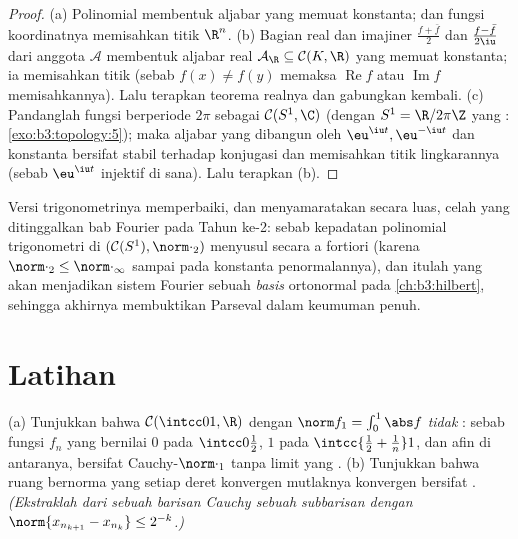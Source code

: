 \begin{proof}
(a) Polinomial membentuk aljabar yang memuat konstanta; dan fungsi
koordinatnya memisahkan titik $\R^n$.
(b) Bagian real dan imajiner $\frac{f + \bar f}2$ dan
$\frac{f - \bar f}{2\iu}$ dari anggota $\mathcal A$ membentuk
aljabar real $\mathcal A_\R \subseteq \mathcal C(K, \R)$ yang memuat
konstanta; ia memisahkan titik (sebab $f(x) \ne f(y)$ memaksa
$\operatorname{Re}f$ atau $\operatorname{Im}f$ memisahkannya).
Lalu terapkan teorema realnya dan gabungkan kembali.
(c) Pandanglah fungsi berperiode $2\pi$ sebagai $\mathcal C(S^1, \C)$
(dengan $S^1 = \R/2\pi\Z$ yang :
\cref{exo:b3:topology:5}); maka aljabar yang dibangun oleh
$\eu^{\iu t}, \eu^{-\iu t}$ dan konstanta bersifat stabil terhadap
konjugasi dan memisahkan titik lingkarannya (sebab $\eu^{\iu t}$
injektif di sana). Lalu terapkan (b).
\end{proof}

\begin{remark}\label{rem:b3:complete:swremark}
Versi trigonometrinya memperbaiki, dan menyamaratakan secara luas,
celah yang ditinggalkan bab Fourier pada Tahun ke-2: sebab kepadatan polinomial
trigonometri di $(\mathcal C(S^1), \norm\cdot_2)$ menyusul secara
a fortiori (karena $\norm\cdot_2 \leq \norm\cdot_\infty$ sampai pada
konstanta penormalannya), dan itulah yang akan menjadikan sistem Fourier sebuah
\emph{basis} ortonormal pada \cref{ch:b3:hilbert}, sehingga akhirnya
membuktikan Parseval dalam keumuman penuh.
\end{remark}

\section{Latihan}

\begin{exercise}[$\star$]\label{exo:b3:complete:1}
(a) Tunjukkan bahwa $\mathcal C(\intcc01, \R)$ dengan
$\norm f_1 = \int_0^1\abs f$ \emph{tidak} : sebab
fungsi $f_n$ yang bernilai $0$ pada $\intcc0{\frac12}$, $1$ pada
$\intcc{\frac12 + \frac1n}1$, dan afin di antaranya, bersifat
Cauchy-$\norm\cdot_1$ tanpa limit yang .
(b) Tunjukkan bahwa ruang bernorma yang setiap deret konvergen
mutlaknya konvergen bersifat . \emph{(Ekstraklah dari sebuah
barisan Cauchy sebuah subbarisan dengan $\norm{x_{n_{k+1}} -
x_{n_k}} \leq 2^{-k}$.)}
\end{exercise}

